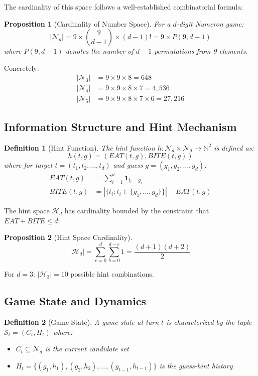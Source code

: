 \documentclass{article}
\newtheorem{definition}{Definition}
\newtheorem{proposition}{Proposition}
\begin{document}
The cardinality of this space follows a well-established combinatorial formula:

\begin{proposition}[Cardinality of Number Space]
For a $d$-digit Numeron game:
$$|\mathcal{N}_d| = 9 \times \binom{9}{d-1} \times (d-1)! = 9 \times P(9, d-1)$$
where $P(9, d-1)$ denotes the number of $d-1$ permutations from 9 elements.
\end{proposition}

Concretely:
\begin{align}
|\mathcal{N}_3| &= 9 \times 9 \times 8 = 648 \\
|\mathcal{N}_4| &= 9 \times 9 \times 8 \times 7 = 4,536 \\
|\mathcal{N}_5| &= 9 \times 9 \times 8 \times 7 \times 6 = 27,216
\end{align}

\subsection{Information Structure and Hint Mechanism}

\begin{definition}[Hint Function]
The hint function $h: \mathcal{N}_d \times \mathcal{N}_d \rightarrow \mathbb{N}^2$ is defined as:
$$h(t, g) = (EAT(t,g), BITE(t,g))$$
where for target $t = (t_1, t_2, \ldots, t_d)$ and guess $g = (g_1, g_2, \ldots, g_d)$:
\begin{align}
EAT(t,g) &= \sum_{i=1}^{d} \mathbf{1}_{t_i = g_i} \\
BITE(t,g) &= \left|\{t_i : t_i \in \{g_1, \ldots, g_d\}\}\right| - EAT(t,g)
\end{align}
\end{definition}

The hint space $\mathcal{H}_d$ has cardinality bounded by the constraint that $EAT + BITE \leq d$:

\begin{proposition}[Hint Space Cardinality]
$$|\mathcal{H}_d| = \sum_{e=0}^{d} \sum_{b=0}^{d-e} 1 = \frac{(d+1)(d+2)}{2}$$
\end{proposition}

For $d=3$: $|\mathcal{H}_3| = 10$ possible hint combinations.

\subsection{Game State and Dynamics}

\begin{definition}[Game State]
A game state at turn $t$ is characterized by the tuple $\mathcal{S}_t = (C_t, H_t)$ where:
\begin{itemize}
\item $C_t \subseteq \mathcal{N}_d$ is the current candidate set
\item $H_t = \{(g_1, h_1), (g_2, h_2), \ldots, (g_{t-1}, h_{t-1})\}$ is the guess-hint history
\end{itemize}
\end{definition}
\end{document}
